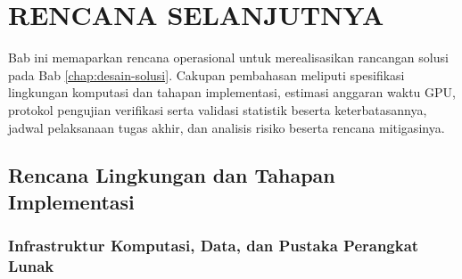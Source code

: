 \chapter{RENCANA SELANJUTNYA}
\label{chap:rencana-selanjutnya}

Bab ini memaparkan rencana operasional untuk merealisasikan rancangan solusi pada Bab \ref{chap:desain-solusi}. Cakupan pembahasan meliputi spesifikasi lingkungan komputasi dan tahapan implementasi, estimasi anggaran waktu GPU, protokol pengujian verifikasi serta validasi statistik beserta keterbatasannya, jadwal pelaksanaan tugas akhir, dan analisis risiko beserta rencana mitigasinya.

\section{Rencana Lingkungan dan Tahapan Implementasi}
\label{sec:rs_implementasi}

\subsection{Infrastruktur Komputasi, Data, dan Pustaka Perangkat Lunak}
\label{sub:rs_lingkungan}

